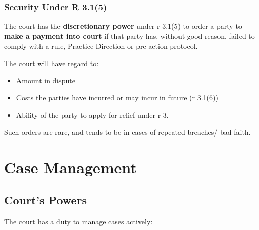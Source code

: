 \documentclass[
]{article}
\providecommand{\tightlist}{%
  \setlength{\itemsep}{0pt}\setlength{\parskip}{0pt}}
\begin{document}
\hypertarget{security-under-r-3.15}{%
\subsubsection{Security Under R 3.1(5)}\label{security-under-r-3.15}}

The court has the \textbf{discretionary power} under r 3.1(5) to order a
party to \textbf{make a payment into court} if that party has, without
good reason, failed to comply with a rule, Practice Direction or
pre-action protocol.

The court will have regard to:

\begin{itemize}
\tightlist
\item
  Amount in dispute
\item
  Costs the parties have incurred or may incur in future (r 3.1(6))
\item
  Ability of the party to apply for relief under r 3.
\end{itemize}

Such orders are rare, and tends to be in cases of repeated breaches/ bad
faith.

\hypertarget{case-management}{%
\section{Case Management}\label{case-management}}

\hypertarget{courts-powers}{%
\subsection{Court's Powers}\label{courts-powers}}

The court has a duty to manage cases actively:
\end{document}
